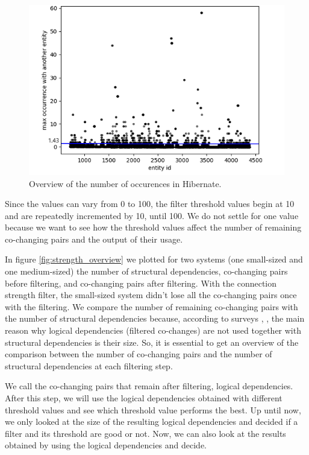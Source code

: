 \documentclass[runningheads]{comsis2}
\begin{document}
\begin{figure}
\centering
\includegraphics[scale=0.7]{fig_hibernate_maxOcc.png}
\caption{Overview of the number of occurences in Hibernate. }
\label{fig:strength_overview_hibernate}
\centering
\end{figure}


Since the values can vary from 0 to 100, the filter threshold values begin at 10 and are repeatedly incremented by 10, until 100. We do not settle for one value because we want to see how the threshold values affect the number of remaining co-changing pairs and the output of their usage.

In figure \ref{fig:strength_overview} we plotted for two systems (one small-sized and one medium-sized) the number of structural dependencies, co-changing pairs before filtering, and co-changing pairs after filtering. With the connection strength filter, the small-sized system didn't lose all the co-changing pairs once with the filtering.
We compare the number of remaining co-changing pairs with the number of structural dependencies because, according to surveys \cite{Shtern:2012:CMS:2332427.2332428}, \cite{sar}, the main reason why logical dependencies (filtered co-changes) are not used together with structural dependencies is their size. So, it is essential to get an overview of the comparison between the number of co-changing pairs and the number of structural dependencies at each filtering step.

We call the co-changing pairs that remain after filtering, logical dependencies. 
After this step, we will use the logical dependencies obtained with different threshold values and see which threshold value performs the best. Up until now, we only looked at the size of the resulting logical dependencies and decided if a filter and its threshold are good or not. Now, we can also look at the results obtained by using the logical dependencies and decide.
\end{document}
